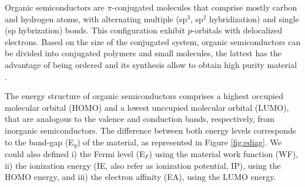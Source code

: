 Organic semiconductors are $\pi$-conjugated molecules that comprise mostly carbon and hydrogen atoms, with alternating multiple (sp$^{3}$, sp$^{2}$ hybridization) and single (sp hybrization) bonds. This configuration exhibit $p$-orbitals with delocalized electrons. %
Based on the size of the conjugated system, organic semiconductors can be divided into conjugated polymers and small molecules, the lattest has the advantage of being ordered and its synthesis allow to obtain high purity material \cite{alcacerElectronicStructureOrganic2018}.

The energy structure of organic semiconductors comprises a highest occupied molecular orbital (HOMO) and a lowest unccupied molecular orbital (LUMO), that are analogous to the valence and conduction bands, respectively, from inorganic semiconductors. The difference between both energy levels corresponds to the band-gap (E$_{g}$) of the material, as represented in Figure \ref{fig:ediag}. We could also defined i) the Fermi level (E$_{F}$) using the material work function (WF), ii) the ionization energy (IE, also refer as ionization potential, IP), using the HOMO energy, and iii) the electron affinity (EA), using the LUMO energy.




